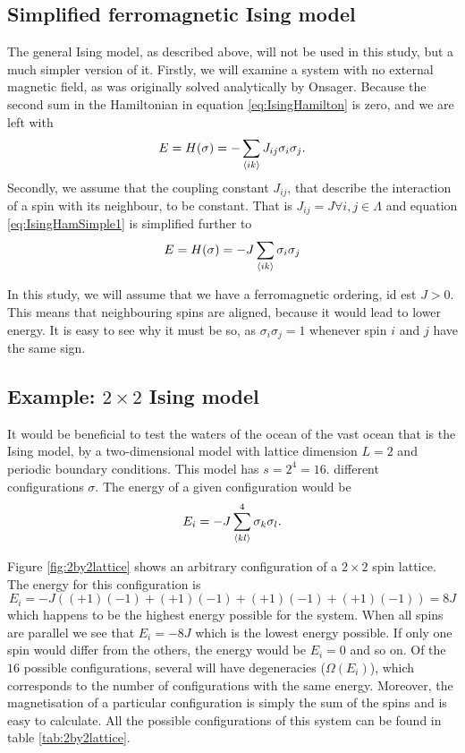\documentclass[10pt,a4paper]{amsart}
\begin{document}
\subsection{Simplified ferromagnetic Ising model}
The general Ising model, as described above, will not be used in this study, but a much simpler version of it. Firstly, we will examine a system with no external magnetic field, as was originally solved analytically by Onsager\cite{Onsager}. Because the second sum in the Hamiltonian in equation \ref{eq:IsingHamilton} is zero, and we are left with
\begin{equation}
\label{eq:IsingHamSimple1}
E = H(\sigma) = -\sum_{\ev{ik}}J_{ij}\sigma_i\sigma_j.
\end{equation} 
Secondly, we assume that the coupling constant $J_{ij}$, that describe the interaction of a spin with its neighbour, to be constant. That is $J_{ij} = J \forall i,j \in \Lambda$ and equation \ref{eq:IsingHamSimple1} is simplified further to
\begin{equation}
\label{eq:IsingHamSimple2}
E = H(\sigma) = -J \sum_{\ev{ik}}\sigma_i\sigma_j
\end{equation}

In this study, we will assume that we have a ferromagnetic ordering, id est  $J>0$. This means that neighbouring spins are aligned, because it would lead to lower energy. It is easy to see why it must be so, as $\sigma_i\sigma_j=1$ whenever spin $i$ and $j$ have the same sign.

\subsection{Example: $2\times2$ Ising model}
It would be beneficial to test the waters of the ocean of the vast ocean that is the Ising model, by a two-dimensional model with lattice dimension $L=2$ and periodic boundary conditions. This model has $s=2^4=16.$ different configurations $\sigma$. The energy of a given configuration would be
\begin{equation*}
E_i = -J \sum_{\ev{kl}}^4 \sigma_k \sigma_l.
\end{equation*}

Figure \ref{fig:2by2lattice} shows an arbitrary configuration of a $2\times2$ spin lattice. The energy for this configuration is
\begin{equation*}
E_i = -J((+1)(-1)+(+1)(-1)+(+1)(-1)+(+1)(-1)) = 8J
\end{equation*}
which happens to be the highest energy possible for the system. When all spins are parallel we see that $E_i=-8J$ which is the lowest energy possible. If only one spin would differ from the others, the energy would be $E_i = 0$ and so on. Of the $16$ possible configurations, several will have degeneracies ($\Omega(E_i)$), which corresponds to the number of configurations with the same energy. Moreover, the magnetisation of a particular configuration is simply the sum of the spins and is easy to calculate. All the possible configurations of this system can be found in table \ref{tab:2by2lattice}.
\end{document}
